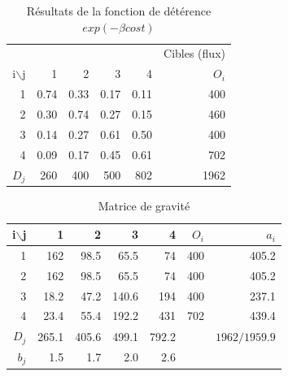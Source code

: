 \begin{table}[htbp]
\begin{center}
\begin{tabular}{rrrrrr}
\hline
& & & & & Cibles (flux)\\
i$\backslash$j & 1 & 2 & 3 & 4 & $O_i$\\
\hline
1 & 0.74 & 0.33 & 0.17 & 0.11 & 400\\

2 & 0.30 & 0.74 & 0.27 & 0.15& 460\\

3 & 0.14 & 0.27 & 0.61 & 0.50 & 400\\

4 & 0.09 & 0.17 & 0.45 & 0.61 & 702\\

$D_j$ & 260 & 400 & 500 & 802 & 1962\\
\hline
\end{tabular}
\caption{\label{tab2_4} R\'esultats de la fonction de d\'et\'erence $exp(-\beta cost)$}
\end{center}
\end{table}


\begin{table}[htbp]
\begin{center}
\begin{tabular}{rrrrrrr}
\hline
i$\backslash$j & 1 & 2 & 3 & 4 & $O_i$ & $a_i$\\
\hline
1 & 162 & 98.5 & 65.5 & 74 & 400 & 405.2\\

2 & 162 & 98.5 & 65.5 & 74 & 400 & 405.2\\

3 & 18.2 & 47.2 & 140.6 & 194 & 400 & 237.1\\

4 & 23.4 & 55.4 & 192.2 & 431 & 702 & 439.4\\

$D_j$ & 265.1 & 405.6 & 499.1 & 792.2 & & $1962 / 1959.9$\\


$b_j$ & 1.5 & 1.7 & 2.0 & 2.6 & &\\
\hline
\end{tabular}
\caption{\label{tab2_5} Matrice de gravit\'e}
\end{center}
\end{table}



